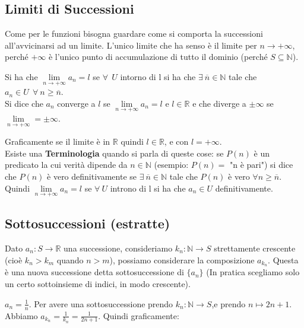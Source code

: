 \subsection{Limiti di Successioni}
Come per le funzioni bisogna guardare come si comporta la successioni all'avvicinarsi ad un limite. L'unico limite che ha senso è il limite per $n\to +\infty$, perché $+\infty$ è l'unico punto di accumulazione di tutto il dominio (perché $S \subseteq \mathbb{N}$).
\begin{definition}
Si ha che $\lim\limits_{n\to +\infty}a_n = l$ se $\forall \:\: U$ intorno di l si ha che $\exists \: \overline{n}\in \mathbb{N}$ tale che $a_n \in U \:\: \forall \: n\geq \overline{n}$.\\
Si dice che $a_n$ converge a $l$ se $\lim\limits_{n\to +\infty}a_n = l$ e $l\in \mathbb{R}$ e che diverge a $\pm \infty$ se $\lim\limits_{n\to +\infty} = \pm \infty$.
\end{definition}

\hspace{-15pt}Graficamente se il limite è in $\mathbb{R}$ quindi $l \in \mathbb{R}$, e con $l = +\infty$.\\
Esiste una \textbf{Terminologia} quando si parla di queste cose: se $P(n)$ è un predicato la cui verità dipende da $n\in \mathbb{N}$ (esempio: $P(n) =$ "n è pari") si dice che $P(n)$ è vero definitivamente se $\exists \: \overline{n}\in \mathbb{N}$ tale che $P(n)$ è vero $\forall n \geq \overline{n}$.\\
Quindi $\lim\limits_{n\to +\infty} a_n = l$ se $\forall \: U$ introno di l si ha che $a_n \in U$ definitivamente.

\subsection{Sottosuccessioni (estratte)}
\begin{definition}[Sottosuccessione]
Dato $a_n: S \to \mathbb{R}$ una successione, consideriamo $k_n: \mathbb{N} \to S$ strettamente crescente (cioè $k_n > k_m$ quando $n>m$), possiamo considerare la composizione $a_{k_n}$. Questa è una nuova successione detta sottosuccessione di $\{a_n\}$ (In pratica scegliamo solo un certo sottoinsieme di indici, in modo crescente).
\end{definition}

\begin{example}
$a_n = \frac{1}{n}$. Per avere una sottosuccessione prendo $k_n: \mathbb{N}\to S$,e prendo $n \mapsto 2n+1$. Abbiamo $a_{k_n} = \frac{1}{k_n} = \frac{1}{2n+1}$. Quindi graficamente:
\end{example}

